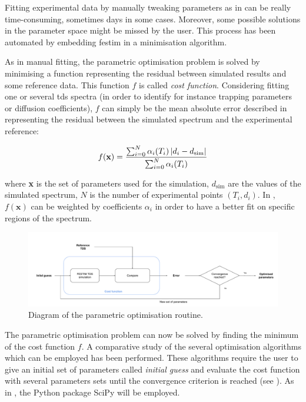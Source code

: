 Fitting experimental data by manually tweaking parameters as in  can be really time-consuming, sometimes days in some cases.
Moreover, some possible solutions in the parameter space might be missed by the user.
This process has been automated by embedding \gls{festim} in a minimisation algorithm.

As in manual fitting, the parametric optimisation problem is solved by minimising a function representing the residual between simulated results and some reference data.
This function $f$ is called \textit{cost function}.
Considering fitting one or several \gls{tds} spectra (in order to identify for instance trapping parameters or diffusion coefficients), $f$ can simply be the mean absolute error described in  representing the residual between the simulated spectrum and the experimental reference: 

\begin{equation}
    f(\textbf{x})=\frac{\sum_{i=0}^{N}  \alpha_i(T_i)\left| d_{i}-d_{\mathrm{sim}}\right|}{\sum_{i=0}^{N}  \alpha_i(T_i)}
    \labeq{cost function}
\end{equation}

where \textbf{x} is the set of parameters used for the simulation, $d_\mathrm{sim}$ are the values of the simulated spectrum, $N$ is the number of experimental points $(T_i, d_i)$.
In , $f(\textbf{x})$ can be weighted by coefficients $\alpha_i$ in order to have a better fit on specific regions of the spectrum.

\begin{figure}
    \centering
    \includegraphics[width=\linewidth]{Figures/Chapter3/Parametric_optimisation/algorithm diagram.pdf}
    \caption{Diagram of the parametric optimisation routine.}
\end{figure}

The parametric optimisation problem can now be solved by finding the minimum of the cost function $f$.
A comparative study of the several optimisation algorithms which can be employed has been performed.
These algorithms require the user to give an initial set of parameters called \textit{initial guess} and evaluate the cost function with several parameters sets until the convergence criterion is reached (see ).
As in , the Python package SciPy  will be employed.

